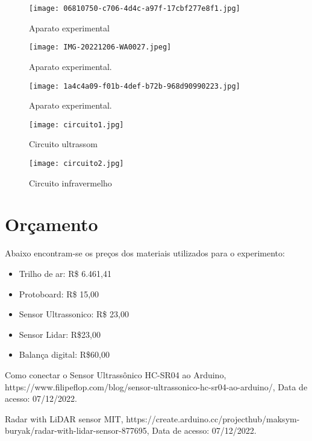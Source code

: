 \documentclass[a4paper,12pt]{article}
\begin{document}
\begin{multicols}{2}
\begin{figure}[H] 
\centering
\texttt{[image: 06810750-c706-4d4c-a97f-17cbf277e8f1.jpg]} 
\caption{Aparato experimental} 
\end{figure}

\begin{figure}[H] 
\centering
\texttt{[image: IMG-20221206-WA0027.jpeg]} 
\caption{Aparato experimental.} 
\end{figure}

\begin{figure}[H] 
\centering
\texttt{[image: 1a4c4a09-f01b-4def-b72b-968d90990223.jpg]} 
\caption{Aparato experimental.} 
\end{figure}

\begin{figure}[H] 
\centering
\texttt{[image: circuito1.jpg]} 
\caption{Circuito ultrassom} 
\end{figure}

\begin{figure}[H] 
\centering
\texttt{[image: circuito2.jpg]} 
\caption{Circuito infravermelho} 
\end{figure}

\section{Orçamento}

Abaixo encontram-se os preços dos materiais utilizados para o experimento:

\begin{itemize}
    \item Trilho de ar: R\$ 6.461,41
    \item Protoboard: R\$ 15,00
    \item Sensor Ultrassonico: R\$ 23,00
    \item Sensor Lidar: R\$23,00
    \item Balança digital: R\$60,00
\end{itemize}

\begin{thebibliography}{1}

Como conectar o Sensor Ultrassônico HC-SR04 ao Arduino, https://www.filipeflop.com/blog/sensor-ultrassonico-hc-sr04-ao-arduino/, Data de acesso: 07/12/2022.

Radar with LiDAR sensor MIT, https://create.arduino.cc/projecthub/maksym-buryak/radar-with-lidar-sensor-877695, Data de acesso: 07/12/2022.

\end{thebibliography}

\end{multicols}
\end{document}
